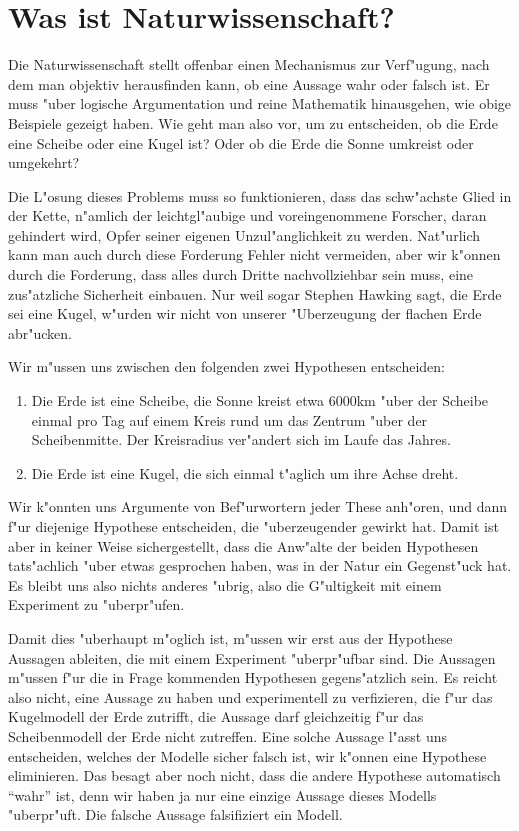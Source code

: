 \section*{Was ist Naturwissenschaft?}
Die Naturwissenschaft stellt offenbar einen Mechanismus zur Verf"ugung,
nach dem man objektiv herausfinden kann, ob eine Aussage wahr oder falsch ist.
Er muss "uber logische Argumentation und reine Mathematik hinausgehen,
wie obige Beispiele gezeigt haben.
Wie geht man also vor, um zu entscheiden, ob die Erde eine Scheibe
oder eine Kugel ist?
Oder ob die Erde die Sonne umkreist oder umgekehrt?

Die L"osung dieses Problems muss so funktionieren, dass das schw"achste
Glied in der Kette, n"amlich der leichtgl"aubige und voreingenommene
Forscher, daran gehindert wird, Opfer seiner eigenen Unzul"anglichkeit
zu werden.
Nat"urlich kann man auch durch diese Forderung Fehler nicht vermeiden,
aber wir k"onnen durch die Forderung, dass alles durch Dritte nachvollziehbar
sein muss, eine zus"atzliche Sicherheit einbauen.
Nur weil sogar Stephen Hawking sagt, die Erde sei eine Kugel, w"urden wir
nicht von unserer "Uberzeugung der flachen Erde abr"ucken.

Wir m"ussen uns zwischen den folgenden zwei Hypothesen entscheiden:
\begin{enumerate}
\item Die Erde ist eine Scheibe, die Sonne kreist etwa 6000km "uber der
Scheibe einmal pro Tag auf einem Kreis rund um das Zentrum "uber der
Scheibenmitte. 
Der Kreisradius ver"andert sich im Laufe das Jahres.
\item Die Erde ist eine Kugel, die sich einmal t"aglich um ihre
Achse dreht.
\end{enumerate}
Wir k"onnten uns Argumente von Bef"urwortern jeder These anh"oren,
und dann f"ur diejenige Hypothese entscheiden, die "uberzeugender
gewirkt hat. 
Damit ist aber in keiner Weise sichergestellt, dass die Anw"alte der
beiden Hypothesen tats"achlich "uber etwas gesprochen haben, was
in der Natur ein Gegenst"uck hat.
Es bleibt uns also nichts anderes "ubrig, also die G"ultigkeit mit
einem Experiment zu "uberpr"ufen.

Damit dies "uberhaupt m"oglich ist, m"ussen wir erst aus der Hypothese
Aussagen ableiten, die mit einem Experiment "uberpr"ufbar sind.
Die Aussagen m"ussen f"ur die in Frage kommenden Hypothesen gegens"atzlich
sein.
Es reicht also nicht, eine Aussage zu haben und experimentell zu
verfizieren, die f"ur das Kugelmodell der Erde zutrifft,
die Aussage darf gleichzeitig f"ur das Scheibenmodell der Erde
nicht zutreffen.
Eine solche Aussage l"asst uns entscheiden, welches der Modelle
sicher falsch ist, wir k"onnen eine Hypothese eliminieren.
Das besagt aber noch nicht, dass die andere Hypothese automatisch
``wahr'' ist, denn wir haben ja nur eine einzige Aussage dieses
Modells "uberpr"uft.
Die falsche Aussage falsifiziert ein Modell.

